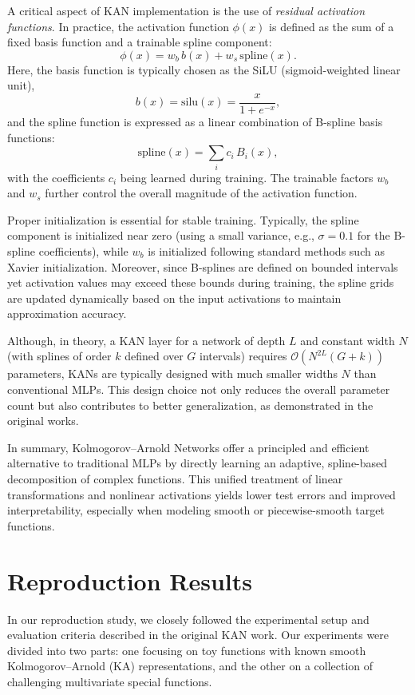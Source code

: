 \documentclass[conference]{IEEEtran}
\begin{document}
A critical aspect of KAN implementation is the use of \emph{residual activation
    functions}. In practice, the activation function \(\phi(x)\) is defined as the
sum of a fixed basis function and a trainable spline component:
\[
    \phi(x) = w_b\,b(x) + w_s\,\text{spline}(x).
\]
Here, the basis function is typically chosen as the SiLU (sigmoid-weighted
linear unit),
\[
    b(x) = \text{silu}(x) = \frac{x}{1+e^{-x}},
\]
and the spline function is expressed as a linear combination of B-spline basis
functions:
\[
    \text{spline}(x) = \sum_i c_i\,B_i(x),
\]
with the coefficients \(c_i\) being learned during training. The trainable
factors \(w_b\) and \(w_s\) further control the overall magnitude of the
activation function.

Proper initialization is essential for stable training. Typically, the spline
component is initialized near zero (using a small variance, e.g.,
\(\sigma=0.1\) for the B-spline coefficients), while \(w_b\) is initialized
following standard methods such as Xavier initialization. Moreover, since
B-splines are defined on bounded intervals yet activation values may exceed
these bounds during training, the spline grids are updated dynamically based on
the input activations to maintain approximation accuracy.

Although, in theory, a KAN layer for a network of depth \(L\) and constant
width \(N\) (with splines of order \(k\) defined over \(G\) intervals) requires
\(\mathcal{O}(N^{2L}(G+k))\) parameters, KANs are typically designed with much
smaller widths \(N\) than conventional MLPs. This design choice not only
reduces the overall parameter count but also contributes to better
generalization, as demonstrated in the original works.

In summary, Kolmogorov–Arnold Networks offer a principled and efficient
alternative to traditional MLPs by directly learning an adaptive, spline-based
decomposition of complex functions. This unified treatment of linear
transformations and nonlinear activations yields lower test errors and improved
interpretability, especially when modeling smooth or piecewise-smooth target
functions.

\section{Reproduction Results}

In our reproduction study, we closely followed the experimental setup and
evaluation criteria described in the original KAN work. Our experiments were
divided into two parts: one focusing on toy functions with known smooth
Kolmogorov–Arnold (KA) representations, and the other on a collection of
challenging multivariate special functions.
\end{document}

